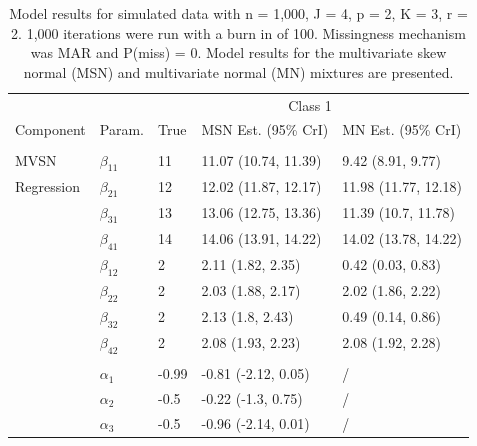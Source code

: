 \documentclass[useAMS,referee]{biom}
\begin{document}
\begin{table}[t]

\caption{\label{tab:sim1_parms}Model results for simulated data with n = 1,000, J = 4, p = 2, K = 3, r = 2. 1,000 iterations were run with a burn in of 100. Missingness mechanism was MAR and P(miss) = 0. Model results for the multivariate skew normal (MSN) and multivariate normal (MN) mixtures are presented.}
\centering
\fontsize{7}{9}\selectfont
\begin{tabular}{lllll}
\toprule
\multicolumn{2}{c}{ } & \multicolumn{3}{c}{Class 1} \\
\cmidrule(l{3pt}r{3pt}){3-5}
Component & Param. & True & MSN Est. (95\% CrI) & MN Est. (95\% CrI) \\
\midrule
\addlinespace[0.3em]
\multicolumn{5}{l}{\textbf{ }}\\
\hspace{1em}MVSN & $\beta_{11}$ & 11 & 11.07 (10.74, 11.39) & 9.42 (8.91, 9.77)\\
\hspace{1em}Regression & $\beta_{21}$ & 12 & 12.02 (11.87, 12.17) & 11.98 (11.77, 12.18)\\
\hspace{1em} & $\beta_{31}$ & 13 & 13.06 (12.75, 13.36) & 11.39 (10.7, 11.78)\\
\hspace{1em} & $\beta_{41}$ & 14 & 14.06 (13.91, 14.22) & 14.02 (13.78, 14.22)\\
\hspace{1em} & $\beta_{12}$ & 2 & 2.11 (1.82, 2.35) & 0.42 (0.03, 0.83)\\
\hspace{1em} & $\beta_{22}$ & 2 & 2.03 (1.88, 2.17) & 2.02 (1.86, 2.22)\\
\hspace{1em} & $\beta_{32}$ & 2 & 2.13 (1.8, 2.43) & 0.49 (0.14, 0.86)\\
\hspace{1em} & $\beta_{42}$ & 2 & 2.08 (1.93, 2.23) & 2.08 (1.92, 2.28)\\
\addlinespace[0.3em]
\multicolumn{5}{l}{\textbf{ }}\\
\hspace{1em} & $\alpha_{1}$ & -0.99 & -0.81 (-2.12, 0.05) &     / \\
\hspace{1em} & $\alpha_{2}$ & -0.5 & -0.22 (-1.3, 0.75) &     / \\
\hspace{1em} & $\alpha_{3}$ & -0.5 & -0.96 (-2.14, 0.01) &     / \\

\end{tabular}
\end{table}
\end{document}
